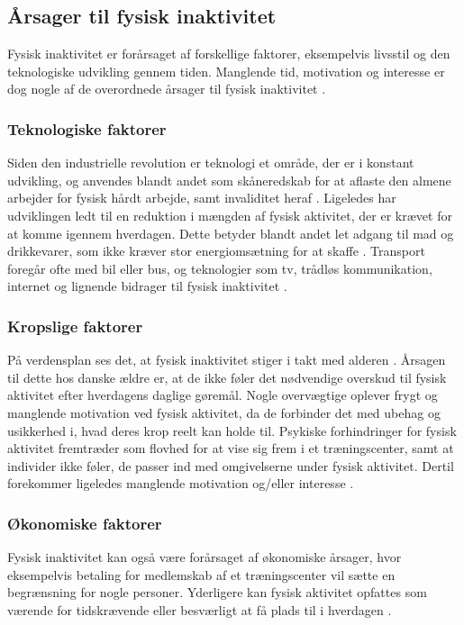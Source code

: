 \subsection{Årsager til fysisk inaktivitet}
Fysisk inaktivitet er forårsaget af forskellige faktorer, eksempelvis livsstil og den teknologiske udvikling gennem tiden. Manglende tid, motivation og interesse er dog nogle af de overordnede årsager til fysisk inaktivitet \citep{ottesen2005}.  

\subsubsection{Teknologiske faktorer}  
Siden den industrielle revolution er teknologi et område, der er i konstant udvikling, og anvendes blandt andet som skåneredskab for at aflaste den almene arbejder for fysisk hårdt arbejde, samt invaliditet heraf \citep{hallal2012}. 
Ligeledes har udviklingen ledt til en reduktion i mængden af fysisk aktivitet, der er krævet for at komme igennem hverdagen. Dette betyder blandt andet let adgang til mad og drikkevarer, som ikke kræver stor energiomsætning for at skaffe \citep{motionsraad2007,hallal2012}. Transport foregår ofte med bil eller bus, og teknologier som tv, trådløs kommunikation, internet og lignende bidrager til fysisk inaktivitet \citep{hallal2012}.  

\subsubsection{Kropslige faktorer}
På verdensplan ses det, at fysisk inaktivitet stiger i takt med alderen \citep{guthold2008}. 
Årsagen til dette hos danske ældre er, at de ikke føler det nødvendige overskud til fysisk aktivitet efter hverdagens daglige gøremål. 
Nogle overvægtige oplever frygt og manglende motivation ved fysisk aktivitet, da de forbinder det med ubehag og usikkerhed i, hvad deres krop reelt kan holde til. 
Psykiske forhindringer for fysisk aktivitet fremtræder som flovhed for at vise sig frem i et træningscenter, samt at individer ikke føler, de passer ind med omgivelserne under fysisk aktivitet. 
Dertil forekommer ligeledes manglende motivation og/eller interesse \citep{ottesen2005}.

\subsubsection{Økonomiske faktorer}
Fysisk inaktivitet kan også være forårsaget af økonomiske årsager, hvor eksempelvis betaling for medlemskab af et træningscenter vil sætte en begrænsning for nogle personer. Yderligere kan fysisk aktivitet opfattes som værende for tidskrævende eller besværligt at få plads til i hverdagen \citep{ottesen2005}.